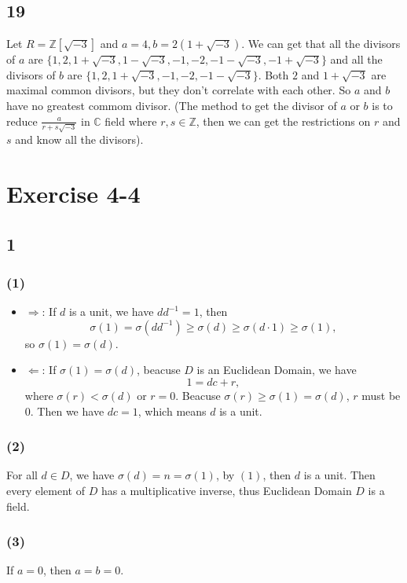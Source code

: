 \documentclass[draft]{article}
\begin{document}
		\subsection*{19}
			Let $R = \mathbb{Z}[\sqrt{-3}]$ and $a = 4, b = 2(1+\sqrt{-3})$. We can
			get that all the divisors of $a$ are $\{1, 2, 1+\sqrt{-3}, 1-\sqrt{-3},
			-1, -2, -1-\sqrt{-3}, -1+\sqrt{-3}\}$ and all the divisors of $b$ are $\{
				1, 2, 1+\sqrt{-3}, -1, -2, -1-\sqrt{-3}\}$. Both $2$ and $1+\sqrt{-3}$
			are maximal common divisors, but they don't correlate with each other. So
			$a$ and $b$ have no greatest commom divisor. (The method to get the
			divisor of $a$ or $b$ is to reduce $\frac{a}{r+s\sqrt{-3}}$ in
			$\mathbb{C}$ field where $r,s\in\mathbb{Z}$, then we can get the
			restrictions on $r$ and $s$ and know all the divisors).
	\section*{Exercise 4-4}
		\subsection*{1}
			\subsubsection*{(1)}
				\begin{itemize}
					\item $\Rightarrow$:
					If $d$ is a unit, we have $dd^{-1} = 1$, then 
					$$
					\sigma(1) = \sigma(dd^{-1}) \geq \sigma(d) \geq \sigma(d\cdot1) \geq
					\sigma(1),
					$$
					so $\sigma(1) = \sigma(d)$.

					\item $\Leftarrow$:
					If $\sigma(1) = \sigma(d)$, beacuse $D$ is an Euclidean Domain, we have
					$$
						1 = dc + r,
					$$
					where $\sigma(r) < \sigma(d)$ or $r = 0$. Beacuse $\sigma(r) \geq
					\sigma(1) = \sigma(d)$, $r$ must be $0$. Then we have $dc = 1$, which
					means $d$ is a unit.
				\end{itemize}
			\subsubsection*{(2)}
				For all $d \in D$, we have $\sigma(d) = n = \sigma(1)$, by $(1)$, then
				$d$ is a unit. Then every element of $D$ has a multiplicative inverse,
				thus Euclidean Domain $D$ is a field.
			\subsubsection*{(3)}
				If $a = 0$, then $a = b = 0$.
\end{document}
